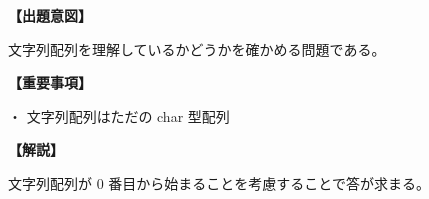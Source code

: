 \noindent \textbf{【出題意図】}

\noindent 文字列配列を理解しているかどうかを確かめる問題である。

\vspace{1em}
\noindent \textbf{【重要事項】}

\medskip
\noindent ・ 文字列配列はただの char 型配列

\vspace{1em}
\noindent \textbf{【解説】}

\noindent 文字列配列が 0 番目から始まることを考慮することで答が求まる。
